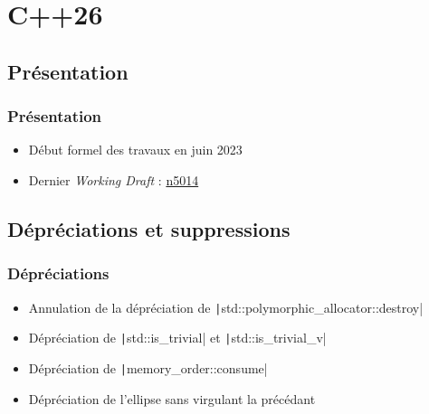 \documentclass[C++.tex]{subfiles}
\begin{document}
\section{C++26}
\subsection*{Présentation}
\begin{frame}
	\frametitle{Présentation}
	\begin{itemize}
		\item Début formel des travaux en juin 2023
		\item Dernier \textit{Working Draft} : \href{https://www.open-std.org/jtc1/sc22/wg21/docs/papers/2025/n5014.pdf}{n5014\linklogo}
	\end{itemize}
\end{frame}

\subsection*{Dépréciations et suppressions}
\begin{frame}[fragile]
	\frametitle{Dépréciations}
	\begin{itemize}
		\item Annulation de la dépréciation de \texttt|std::polymorphic_allocator::destroy|
		\item Dépréciation de \texttt|std::is_trivial| et \texttt|std::is_trivial_v|
		\item Dépréciation de \texttt|memory_order::consume|
		\item Dépréciation de l'ellipse sans virgulant la précédant
	\end{itemize}

\end{frame}
\end{document}
